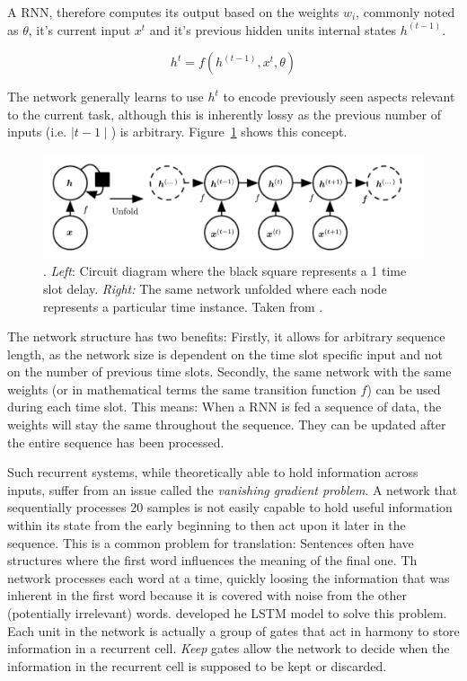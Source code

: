 A \ac{RNN}, therefore computes its output based on the weights $w_i$, commonly noted as $\theta$, it's current input
$x^t$ and it's previous hidden units internal states $h^(t-1)$.

\[
    h^t = f(h^(t-1), x^t, \theta)
\]

The network generally learns to use $h^t$ to encode previously seen aspects relevant to the current task, although this
is inherently lossy as the previous number of inputs (i.e. $\mid t-1\mid$) is arbitrary. Figure~\ref{fig:rnn_concept}
shows this concept.

\begin{figure}[]
    \centering
    \includegraphics[width=0.8\linewidth]{img/rnn_concept.png}
    \caption[Recurrent Neural Network conceptualized]{. \emph{Left}: Circuit diagram where the black square represents a
        1 time slot delay. \emph{Right:} The same network unfolded where each node represents a particular time instance.
    Taken from \citet{Goodfellow-et-al-2016}.}
    \label{fig:rnn_concept}
\end{figure}

The network structure has two benefits: Firstly, it allows for arbitrary sequence length, as the network size is
dependent on the time slot specific input and not on the number of previous time slots. Secondly, the same network with
the same weights (or in mathematical terms the same transition function $f$) can be used during each time slot. This
means: When a \ac{RNN} is fed a sequence of data, the weights will stay the same throughout the sequence. They can be
updated after the entire sequence has been processed.

Such recurrent systems, while theoretically able to hold information across inputs, suffer from an issue called the
\emph{vanishing gradient problem}. A network that sequentially processes 20 samples is not easily capable to hold useful
information within its state from the early beginning to then act upon it later in the sequence. This is a common
problem for translation: Sentences often have structures where the first word influences the meaning of the final one.
Th network processes each word at a time, quickly loosing the information that was inherent in the first word because it
is covered with noise from the other (potentially irrelevant) words. \citet{Hochreiter:1997:LSM:1246443.1246450}
developed he \ac{LSTM} model to solve this problem. Each unit in the network is actually a group of gates that act in
harmony to store information in a recurrent cell. \emph{Keep} gates allow the network to decide when the information in
the recurrent cell is supposed to be kept or discarded.


